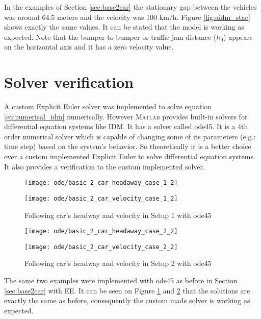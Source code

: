 		In the examples of Section \ref{sec:base2car} the stationary gap between the vehicles was around 64.5 meters and the velocity was 100 km/h. Figure \ref{fig:aidm_stac} shows exactly the same values. It can be stated that the model is working as expected. Note that the bumper to bumper or traffic jam distance ($h_0$) appears on the horizontal axis and it has a zero velocity value.
	\section{Solver verification}
		A custom Explicit Euler solver was implemented to solve equation \ref{eq:numerical_idm} numerically. However \textsc{Matlab} provides built-in solvers for differential equation systems like IDM. It has a solver called ode45. It is a 4th order numerical solver which is capable of changing some of its parameters (e.g.: time step) based on the system's behavior. So theoretically it is a better choice over a custom implemented Explicit Euler to solve differential equation systems. It also provides a verification to the custom implemented solver. 
		\begin{figure}
			\centering
			\begin{minipage}{.5\textwidth}
				\centering
				\texttt{[image: ode/basic\_2\_car\_headaway\_case\_1\_2]}
			\end{minipage}\hfill
			\begin{minipage}{.5\textwidth}
				\centering
				\texttt{[image: ode/basic\_2\_car\_velocity\_case\_1\_2]}
			\end{minipage}
			\caption{Following car's headway and velocity in Setup 1 with ode45}
			\label{fig:basic2car_case_1_ode}
		\end{figure}
		\begin{figure}
			\centering
			\begin{minipage}{.5\textwidth}
				\centering
				\texttt{[image: ode/basic\_2\_car\_headaway\_case\_2\_2]}
			\end{minipage}\hfill
			\begin{minipage}{.5\textwidth}
				\centering
				\texttt{[image: ode/basic\_2\_car\_velocity\_case\_2\_2]}
			\end{minipage}
			\caption{Following car's headway and velocity in Setup 2  with ode45}
			\label{fig:basic2car_case_2_ode}
		\end{figure}

		The same two examples were implemented with ode45 as before in Section \ref{sec:base2car} with EE.
		It can be seen on Figure \ref{fig:basic2car_case_1_ode} and \ref{fig:basic2car_case_2_ode} that the solutions are exactly the same as before, consequently the custom made solver is working as expected.

